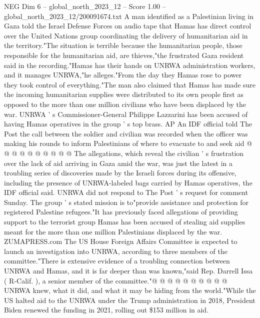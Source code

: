 \begin{textsample}{NEG Dim 6 – global\_north\_2023\_12 – Score 1.00 – global\_north\_2023\_12/200091674.txt}  \label{ex:f6_neg_261}
A man identified as a Palestinian living in Gaza told the Israel Defense Forces on audio tape that Hamas has direct control over the United Nations group coordinating the delivery of humanitarian aid in the territory."The situation is terrible because the humanitarian people, those responsible for the humanitarian aid, are thieves,"the frustrated Gaza resident said in the recording."Hamas has their hands on UNRWA administration workers, and it manages UNRWA,"he alleges."From the day they Hamas rose to power they took control of everything."The man also claimed that Hamas has made sure the incoming humanitarian supplies were distributed to its own people first as opposed to the more than one million civilians who have been displaced by the war.
UNRWA ' s Commissioner-General Philippe Lazzarini has been accused of having Hamas operatives in the group ' s top brass.
AP An IDF official told The Post the call between the soldier and civilian was recorded when the officer was making his rounds to inform Palestinians of where to evacuate to and seek aid @ @ @ @ @ @ @ @ @ @ The allegations, which reveal the civilian ' s frustration over the lack of aid arriving in Gaza amid the war, was just the latest in a troubling series of discoveries made by the Israeli forces during its offensive, including the presence of UNRWA-labeled bags carried by Hamas operatives, the IDF official said.
UNRWA did not respond to The Post ' s request for comment Sunday.
The group ' s stated mission is to"provide assistance and protection for registered Palestine refugees."It has previously faced allegations of providing support to the terrorist group Hamas has been accused of stealing aid supplies meant for the more than one million Palestinians displaced by the war.
ZUMAPRESS.com The US House Foreign Affairs Committee is expected to launch an investigation into UNRWA, according to three members of the committee."There is extensive evidence of a troubling connection between UNRWA and Hamas, and it is far deeper than was known,"said Rep.
Darrell Issa ( R-Calif. ), a senior member of the committee."@ @ @ @ @ @ @ @ @ @ UNRWA knew, what it did, and what it may be hiding from the world."While the US halted aid to the UNRWA under the Trump administration in 2018, President Biden renewed the funding in 2021, rolling out \$153 million in aid.

\end{textsample}
